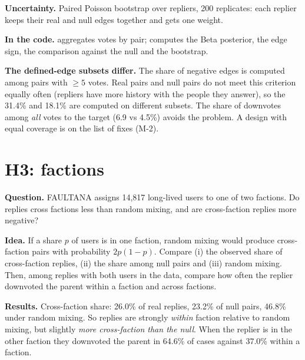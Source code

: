 \textbf{Uncertainty.} Paired Poisson bootstrap over repliers, 200 replicates: each replier keeps their real and null edges together and gets one weight.

\textbf{In the code.}  aggregates votes by pair;  computes the Beta posterior, the edge sign, the comparison against the null and the bootstrap.

\begin{pitfall}
\textbf{The defined-edge subsets differ.} The share of negative edges is computed among pairs with $\ge5$ votes. Real pairs and null pairs do not meet this criterion equally often (repliers have more history with the people they answer), so the 31.4\% and 18.1\% are computed on different subsets. The share of downvotes among \emph{all} votes to the target (6.9 vs 4.5\%) avoids the problem. A design with equal coverage is on the list of fixes (M-2).
\end{pitfall}

\section{H3: factions}\label{sec:h3}

\textbf{Question.} FAULTANA assigns 14,817 long-lived users to one of two factions. Do replies cross factions less than random mixing, and are cross-faction replies more negative?

\textbf{Idea.} If a share $p$ of users is in one faction, random mixing would produce cross-faction pairs with probability $2p(1-p)$. Compare (i) the observed share of cross-faction replies, (ii) the share among null pairs and (iii) random mixing. Then, among replies with both users in the data, compare how often the replier downvoted the parent within a faction and across factions.

\textbf{Results.} Cross-faction share: 26.0\% of real replies, 23.2\% of null pairs, 46.8\% under random mixing. So replies are strongly \emph{within} faction relative to random mixing, but slightly \emph{more cross-faction than the null}. When the replier is in the other faction they downvoted the parent in 64.6\% of cases against 37.0\% within a faction.

